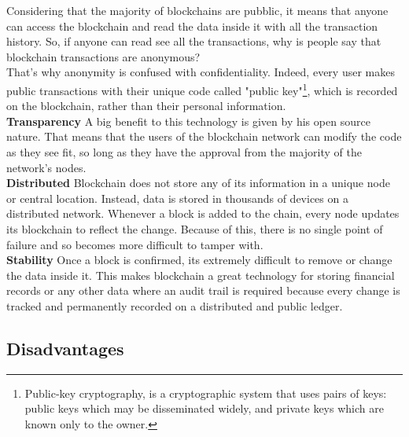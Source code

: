Considering that the majority of blockchains are pubblic, it means that anyone 
can access the blockchain and read the data inside it with all the transaction 
history. So, if anyone can read see all the transactions, why is people say that
blockchain transactions are anonymous?\\
That’s why anonymity is confused with confidentiality. Indeed, every user makes 
public transactions with their unique code called "public key"\footnote{Public-key cryptography, is a cryptographic system that uses pairs of keys: public keys which may be disseminated widely, and private keys which are known only to the owner.},
which is recorded on the blockchain, rather than their personal information.\cite{investopedia}
\bigskip\\
\textbf{Transparency}
A big benefit to this technology is given by his open source nature. That means
that the users of the blockchain network can modify the code as they see fit, so long
as they have the approval from the majority of the network's nodes.
\bigskip\\
\textbf{Distributed}
Blockchain does not store any of its information in a unique node or central 
location. Instead, data is stored in thousands of devices on a distributed
network. Whenever a block is added to the chain, every node updates its blockchain
to reflect the change. Because of this, there is no single point of failure
and so becomes more difficult to tamper with.\cite{binancevision}\cite{investopedia}
\bigskip\\
\textbf{Stability}
Once a block is confirmed, its extremely difficult to remove or change the data inside it.
This makes blockchain a great technology for storing financial records or any other data 
where an audit trail is required because every change is tracked and permanently recorded 
on a distributed and public ledger.\cite{binancevision}
\bigskip

\subsection{Disadvantages}
\label{sec:disadvantages}


